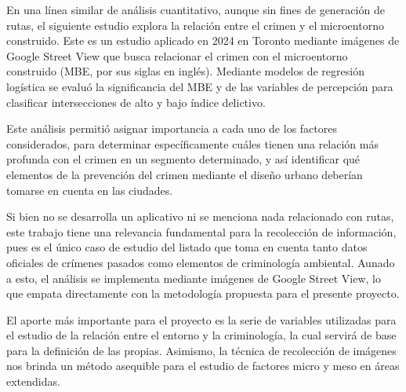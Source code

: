 
En una línea similar de análisis cuantitativo, aunque sin fines de generación de rutas, el siguiente estudio explora la relación entre el crimen y el microentorno construido. Este es un estudio aplicado en 2024 en Toronto mediante imágenes de Google Street View que busca relacionar el crimen con el microentorno construido (MBE, por sus siglas en inglés). Mediante modelos de regresión logística se evaluó la significancia del MBE y de las variables de percepción para clasificar intersecciones de alto y bajo índice delictivo\cite{wu2024analyzing}.

Este análisis permitió asignar importancia a cada uno de los factores considerados, para determinar específicamente cuáles tienen una relación más profunda con el crimen en un segmento determinado, y así identificar qué elementos de la prevención del crimen mediante el diseño urbano deberían tomarse en cuenta en las ciudades\cite{wu2024analyzing}.

Si bien no se desarrolla un aplicativo ni se menciona nada relacionado con rutas, este trabajo tiene una relevancia fundamental para la recolección de información, pues es el único caso de estudio del listado que toma en cuenta tanto datos oficiales de crímenes pasados como elementos de criminología ambiental. Aunado a esto, el análisis se implementa mediante imágenes de Google Street View, lo que empata directamente con la metodología propuesta para el presente proyecto.

El aporte más importante para el proyecto es la serie de variables utilizadas para el estudio de la relación entre el entorno y la criminología, la cual servirá de base para la definición de las propias. Asimismo, la técnica de recolección de imágenes nos brinda un método asequible para el estudio de factores micro y meso en áreas extendidas.
